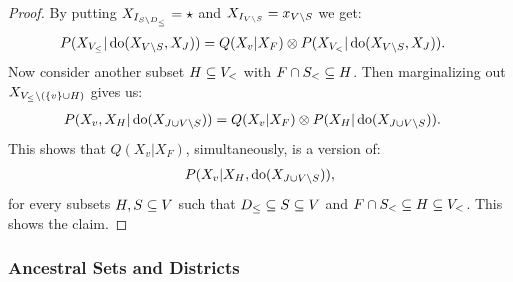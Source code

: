 \begin{Lem}
\begin{proof}
   By putting $X_{I_{S \setminus D_\le}} = \star$ and $X_{I_{V \setminus S}} = x_{V \setminus S}$ we get:
   \begin{align*}
       P(X_{V_\le}|\operatorname{do}(X_{V \setminus S},X_J)) &= Q(X_v|X_F) \otimes P(X_{V_<}|\operatorname{do}(X_{V \setminus S},X_J)).
   \end{align*}
 Now consider another subset $H \subseteq V_<$ with $F \cap S_< \subseteq  H$. 
 Then marginalizing out $X_{V_\le \setminus \left ( \left \{ v \right \} \cup H \right )}$ gives us:
   \begin{align*}
   P(X_v,X_H|\operatorname{do}(X_{J \cup V \setminus S})) &= Q(X_v|X_F) \otimes P(X_H|\operatorname{do}(X_{J \cup V \setminus S})).
   \end{align*}
 This shows that $Q(X_v|X_F)$, simultaneously, is a version of:
   \begin{align*} P(X_v|X_H,\operatorname{do}(X_{J \cup V\setminus S})), 
    \end{align*}
   for every subsets $H,S \subseteq V$ such that $D_\le \subseteq S \subseteq V$ and $F \cap S_< \subseteq  H \subseteq V_<$.
  This shows the claim.
     \end{proof}
\end{Lem}


\subsubsection{Ancestral Sets and Districts}

